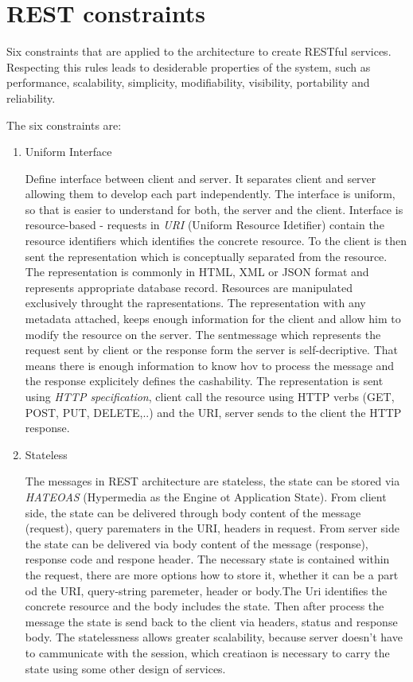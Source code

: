 \section{REST constraints}
\label{sec:constraints}

Six constraints that are applied to the architecture to create RESTful services. Respecting this rules leads to desiderable properties of the system, such as performance, scalability, simplicity, modifiability, visibility, portability and reliability. 
\begin{description}
  \item The six constraints are:

\begin{enumerate}
  \item Uniform Interface
  
Define interface between client and server. It separates client and server allowing them to develop each part independently. The interface is uniform, so that is
easier to understand for both, the server and the client.
Interface is resource-based - requests in \emph {URI} (Uniform Resource Idetifier) contain the resource identifiers which identifies the concrete resource. To the client is then sent the representation which is conceptually separated from the resource. The representation is commonly in HTML, XML or JSON format and represents appropriate database record.
Resources are manipulated exclusively throught the rapresentations. The representation with any metadata attached, keeps enough information for the client and allow him to modify the resource on the server.
The sentmessage which represents the request sent by client or the response form the server is self-decriptive. That means there is enough information to know hov to process the message and the response explicitely defines the cashability.
The representation is sent using \emph{HTTP specification}, client call the resource using HTTP verbs (GET, POST, PUT, DELETE,..) and the URI, server sends to the client the HTTP response.


  \item Stateless

The messages in REST architecture are stateless, the state can be stored via \emph {HATEOAS} (Hypermedia as the Engine ot Application State). From client side, the state can be delivered through body content of the message (request), query parematers in the URI, headers in request. From server side the state can be delivered via body content of the message (response), response code and respone header. 
The necessary state is contained within the request, there are more options how to store it, whether it can be a part od the URI, query-string paremeter, header or body.The Uri identifies the concrete resource and the body includes the state. Then after process the message the state is send back to the client via headers, status and response body.
The statelessness allows greater scalability, because server doesn't have to cammunicate with the session, which creatiaon is necessary to carry the state using some other design of services.



\end{enumerate}
\end{description}
